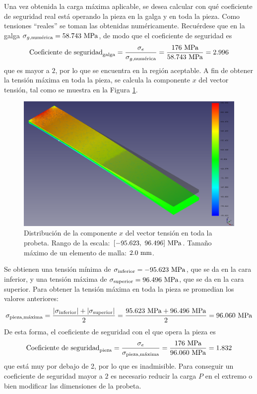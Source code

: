 Una vez obtenida la carga máxima aplicable, se desea calcular con qué coeficiente de seguridad real está operando la pieza en la galga y en toda la pieza. Como tensiones ``reales'' se toman las obtenidas numéricamente. Recuérdese que en la galga $\sigma_{g,\text{numérica}} = 58.743 \ \mega\pascal$, de modo que el coeficiente de seguridad es
\[
    \text{Coeficiente de seguridad}_\text{galga} = 
    \frac{\sigma_e}{\sigma_{g,\text{numérica}}} = 
    \frac{176 \ \mega\pascal}{58.743 \ \mega\pascal} = 
    2.996
\]
que es mayor a $2$, por lo que se encuentra en la región aceptable. A fin de obtener la tensión máxima en toda la pieza, se calcula la componente $x$ del vector tensión, tal como se muestra en la Figura \ref{fig:stress_vector_x_all}.
\begin{figure}[H]
    \centering
    \includegraphics[width=\textwidth]{figures/resultados/stress_vector_x_all.pdf}
    \caption{Distribución de la componente $x$ del vector tensión en toda la probeta. Rango de la escala: $[-95.623, \ 96.496] \ \mega\pascal$. Tamaño máximo de un elemento de malla: $2.0 \ \milli\meter$.}
    \label{fig:stress_vector_x_all}
\end{figure}

\noindent
Se obtienen una tensión mínima de $\sigma_{\text{inferior}} = -95.623 \ \mega\pascal$, que se da en la cara inferior, y una tensión máxima de $\sigma_{\text{superior}} = 96.496 \ \mega\pascal$, que se da en la cara superior. Para obtener la tensión máxima en toda la pieza se promedian los valores anteriores:
\[
    \sigma_{\text{pieza,máxima}} = 
    \frac{\abs{\sigma_\text{inferior}} + 
    \abs{\sigma_\text{superior}}}{2} = 
    \frac{95.623 \ \mega\pascal + 96.496 \ \mega\pascal}{2} = 96.060 \ \mega\pascal
\]
De esta forma, el coeficiente de seguridad con el que opera la pieza es
\[
    \text{Coeficiente de seguridad}_\text{pieza} = 
    \frac{\sigma_e}{\sigma_{\text{pieza,máxima}}} = 
    \frac{176 \ \mega\pascal}{96.060 \ \mega\pascal} = 
    1.832
\]
que está muy por debajo de 2, por lo que es inadmisible. Para conseguir un coeficiente de seguridad mayor a $2$ es necesario reducir la carga $P$ en el extremo o bien modificar las dimensiones de la probeta.


